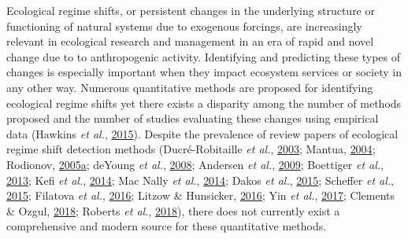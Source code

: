 \documentclass[12pt,twoside,openany]{reedthesis}
\begin{document}
Ecological regime shifts, or persistent changes in the underlying structure or functioning of natural systems due to exogenous forcings, are increasingly relevant in ecological research and management in an era of rapid and novel change due to to anthropogenic activity. Identifying and predicting these types of changes is especially important when they impact ecosystem services or society in any other way. Numerous quantitative methods are proposed for identifying ecological regime shifts yet there exists a disparity among the number of methods proposed and the number of studies evaluating these changes using empirical data (Hawkins \emph{et al.}, \protect\hyperlink{ref-hawkins2015ecosystems}{2015}). Despite the prevalence of review papers of ecological regime shift detection methods (Ducré-Robitaille \emph{et al.}, \protect\hyperlink{ref-ducre2003comparison}{2003}; Mantua, \protect\hyperlink{ref-mantua_methods_2004}{2004}; Rodionov, \protect\hyperlink{ref-rodionov_brief_2005}{2005}\protect\hyperlink{ref-rodionov_brief_2005}{a}; deYoung \emph{et al.}, \protect\hyperlink{ref-deyoung_regime_2008}{2008}; Andersen \emph{et al.}, \protect\hyperlink{ref-andersen_ecological_2009}{2009}; Boettiger \emph{et al.}, \protect\hyperlink{ref-boettiger_early_2013}{2013}; Kefi \emph{et al.}, \protect\hyperlink{ref-kefi2014early}{2014}; Mac Nally \emph{et al.}, \protect\hyperlink{ref-mac2014scrutiny}{2014}; Dakos \emph{et al.}, \protect\hyperlink{ref-dakos2015resilience}{2015}; Scheffer \emph{et al.}, \protect\hyperlink{ref-scheffer2015generic}{2015}; Filatova \emph{et al.}, \protect\hyperlink{ref-filatova2016regime}{2016}; Litzow \& Hunsicker, \protect\hyperlink{ref-litzow_early_2016}{2016}; Yin \emph{et al.}, \protect\hyperlink{ref-yin2017methods}{2017}; Clements \& Ozgul, \protect\hyperlink{ref-clements2018indicators}{2018}; Roberts \emph{et al.}, \protect\hyperlink{ref-roberts2018early}{2018}), there does not currently exist a comprehensive and modern source for these quantitative methods.
\end{document}
